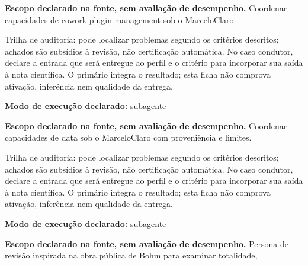 \begin{descricao}
\textbf{Escopo declarado na fonte, sem avaliação de desempenho.}
Coordenar capacidades de cowork-plugin-management sob o MarceloClaro
\end{descricao}

\begin{funcao}
Trilha de auditoria: pode localizar problemas segundo os critérios descritos; achados são subsídios à revisão, não certificação automática. No caso condutor, declare a entrada que será entregue ao perfil e o critério para incorporar sua saída à nota científica. O primário integra o resultado; esta ficha não comprova ativação, inferência nem qualidade da entrega.
\end{funcao}

\begin{arquitetura}
\textbf{Modo de execução declarado:} subagente
\end{arquitetura}


\begin{descricao}
\textbf{Escopo declarado na fonte, sem avaliação de desempenho.}
Coordenar capacidades de data sob o MarceloClaro com proveniência e limites.
\end{descricao}

\begin{funcao}
Trilha de auditoria: pode localizar problemas segundo os critérios descritos; achados são subsídios à revisão, não certificação automática. No caso condutor, declare a entrada que será entregue ao perfil e o critério para incorporar sua saída à nota científica. O primário integra o resultado; esta ficha não comprova ativação, inferência nem qualidade da entrega.
\end{funcao}

\begin{arquitetura}
\textbf{Modo de execução declarado:} subagente
\end{arquitetura}


\begin{descricao}
\textbf{Escopo declarado na fonte, sem avaliação de desempenho.}
Persona de revisão inspirada na obra pública de Bohm para examinar totalidade,
\end{descricao}

